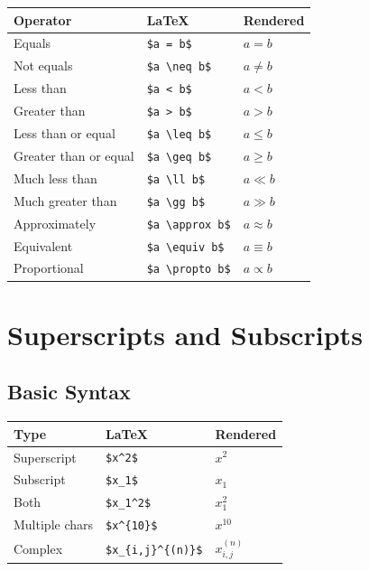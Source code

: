 \documentclass[
  letterpaper,
  DIV=11,
  numbers=noendperiod]{scrartcl}
\begin{document}
\begin{longtable}[]{@{}lll@{}}
\toprule()
Operator & LaTeX & Rendered \\
\midrule()
\endhead
Equals & \texttt{\$a\ =\ b\$} & \(a = b\) \\
Not equals & \texttt{\$a\ \textbackslash{}neq\ b\$} & \(a \neq b\) \\
Less than & \texttt{\$a\ \textless{}\ b\$} & \(a < b\) \\
Greater than & \texttt{\$a\ \textgreater{}\ b\$} & \(a > b\) \\
Less than or equal & \texttt{\$a\ \textbackslash{}leq\ b\$} &
\(a \leq b\) \\
Greater than or equal & \texttt{\$a\ \textbackslash{}geq\ b\$} &
\(a \geq b\) \\
Much less than & \texttt{\$a\ \textbackslash{}ll\ b\$} & \(a \ll b\) \\
Much greater than & \texttt{\$a\ \textbackslash{}gg\ b\$} &
\(a \gg b\) \\
Approximately & \texttt{\$a\ \textbackslash{}approx\ b\$} &
\(a \approx b\) \\
Equivalent & \texttt{\$a\ \textbackslash{}equiv\ b\$} &
\(a \equiv b\) \\
Proportional & \texttt{\$a\ \textbackslash{}propto\ b\$} &
\(a \propto b\) \\
\bottomrule()
\end{longtable}

\hypertarget{superscripts-and-subscripts}{%
\section{Superscripts and
Subscripts}\label{superscripts-and-subscripts}}

\hypertarget{basic-syntax}{%
\subsection{Basic Syntax}\label{basic-syntax}}

\begin{longtable}[]{@{}lll@{}}
\toprule()
Type & LaTeX & Rendered \\
\midrule()
\endhead
Superscript & \texttt{\$x\^{}2\$} & \(x^2\) \\
Subscript & \texttt{\$x\_1\$} & \(x_1\) \\
Both & \texttt{\$x\_1\^{}2\$} & \(x_1^2\) \\
Multiple chars & \texttt{\$x\^{}\{10\}\$} & \(x^{10}\) \\
Complex & \texttt{\$x\_\{i,j\}\^{}\{(n)\}\$} & \(x_{i,j}^{(n)}\) \\
\bottomrule()
\end{longtable}
\end{document}
